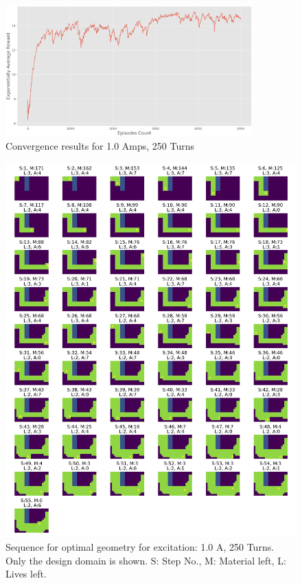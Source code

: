 \begin{figure}[h!]
    \centering
    \includegraphics[width=0.85\textwidth]{Figures/Ch_RL/0.5A_A2C.png}
    \caption{Convergence results for 1.0 Amps, 250 Turns}
    \label{fig:RL_convergence_500AT}
\end{figure}

\begin{figure}[h!]
    \centering
    \includegraphics[width=\textwidth]{Figures/Ch_RL/0.50_Count180_NetForce19.02.png}
    \caption{Sequence for optimal geometry for excitation: 1.0 A, 250 Turns. Only the design domain is shown. S: Step No., M: Material left, L: Lives left.}
    \label{fig:RL_Ccore_0.5A_sequence}
\end{figure}

